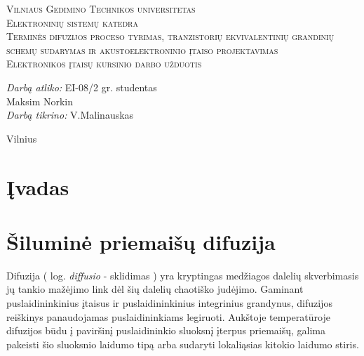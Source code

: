 \documentclass[11pt,a4paper]{article}
\begin{document}
\begin{titlepage}
  
  \begin{center}
    \textsc{\LARGE Vilniaus Gedimino Technikos universitetas}\\[2mm]
    \textsc{\Large Elektroninių sistemų katedra}\\[70mm]
    \textsc{\Large Terminės difuzijos proceso tyrimas, tranzistorių ekvivalentinių grandinių schemų sudarymas ir akustoelektroninio įtaiso projektavimas}\\[10mm]
    \textsc{\normalsize Elektronikos įtaisų kursinio darbo užduotis}\\[40mm]
    \begin{minipage}{1\textwidth}
      \begin{flushright}
        \emph{Darbą atliko:} EI-08/2 gr. studentas\\ Maksim Norkin\\
        \emph{Darbą tikrino:} V.Malinauskas\\
      \end{flushright}
    \end{minipage}
    \vfill
    {\large Vilnius \\ \the\year}
  \end{center}
\end{titlepage}
\tableofcontents
\newpage
\section{Įvadas}
\section{Šiluminė priemaišų difuzija}
Difuzija ( log. \emph{diffusio} - sklidimas ) yra kryptingas medžiagos dalelių skverbimasis jų tankio mažėjimo 
link dėl šių dalelių chaotiško judėjimo. Gaminant puslaidininkinius įtaisus ir puslaidininkinius integrinius grandynus, 
difuzijos reiškinys panaudojamas puslaidininkiams legiruoti. Aukštoje temperatūroje difuzijos būdu į 
paviršinį puslaidininkio sluoksnį įterpus priemaišų, galima pakeisti šio sluoksnio laidumo tipą arba sudaryti lokaliąsias kitokio laidumo stiris.
\end{document}
